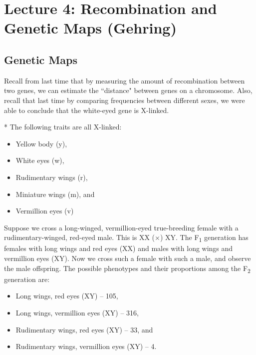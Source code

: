 \section*{Lecture 4: Recombination and Genetic Maps (Gehring)}
\setcounter{section}{4}
\setcounter{subsection}{0}
\setcounter{defn}{0}
\setcounter{defncontainer}{0}

\subsection{Genetic Maps}

Recall from last time that by measuring the amount of recombination between two genes, we can estimate the ``distance" between genes on a chromosome.
Also, recall that last time by comparing frequencies between different sexes, we were able to conclude that the white-eyed gene is X-linked. 

\begin{fact}*
	The following traits are all X-linked:
	\begin{itemize}
		\item Yellow body (y),
		\item White eyes (w),
		\item Rudimentary wings (r), 
		\item Miniature wings (m), and
		\item Vermillion eyes (v)
	\end{itemize}
\end{fact}

\begin{exper}
	[Sturtevant (1913)]
	Suppose we cross a long-winged, vermillion-eyed true-breeding female with a rudimentary-winged, red-eyed male. This is XX ($\times$) XY.
	The F\textsubscript1 generation has females with long wings and red eyes (XX) and males with long wings and vermillion eyes (XY).
	Now we cross such a female with such a male, and observe the male offspring. 
	The possible phenotypes and their proportions among the F\textsubscript2 generation are:
	\begin{itemize}
		\item Long wings, red eyes (XY) -- 105,
		\item Long wings, vermillion eyes (XY) -- 316,
		\item Rudimentary wings, red eyes (XY) -- 33, and
		\item Rudimentary wings, vermillion eyes (XY) -- 4.
	\end{itemize}
\end{exper}

